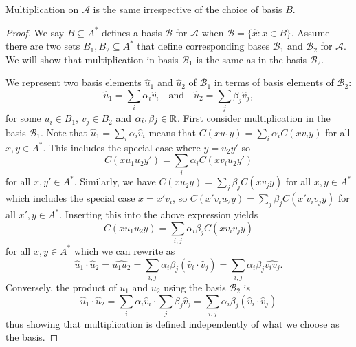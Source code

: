 \documentclass[11pt]{report}
\begin{document}
\begin{prop}
Multiplication on $\mathcal{A}$ is the same irrespective of the choice of basis $B$.
\end{prop}
\begin{proof}

We say $B \subseteq A^*$ defines a basis $\mathcal{B}$ for $\mathcal{A}$ when $\mathcal{B} = \{\hat{x}: x\in B\}$. Assume there are two sets $B_1, B_2 \subseteq A^*$ that define corresponding bases $\mathcal{B}_1$ and $\mathcal{B}_2$ for $\mathcal{A}$. We will show that multiplication in basis $\mathcal{B}_1$ is the same as in the basis $\mathcal{B}_2$.


We represent two basis elements $\hat{u}_1$ and $\hat{u}_2$ of $\mathcal{B}_1$ in terms of basis elements of $\mathcal{B}_2$:
$$\hat{u}_1 = \sum_i \alpha_i \hat{v}_i \quad\text{and}\quad
\hat{u}_2 = \sum_j \beta_j \hat{v}_j,$$
for some $u_i \in B_1$, $v_j \in B_2$ and $\alpha_i, \beta_j  \in \mathbb{R}$.
 First consider multiplication in the basis $\mathcal{B}_1$. Note that $\hat{u}_1 = \sum_i \alpha_i \hat{v}_i$ means that $C(xu_1y) = \sum_i \alpha_i C(xv_iy)$ for all $x,y \in A^*$. This includes the special case where $y = u_2y'$ so $$C(xu_1u_2y') = \sum_i \alpha_i C(xv_iu_2y')$$ for all $x, y' \in A^*$.
Similarly, we have $C(xu_2y) = \sum_j \beta_j C(xv_jy)$ for all $x,y \in A^*$ which includes the special case $x = x'v_i$, so $C(x'v_iu_2y) = \sum_j \beta_j C(x'v_iv_jy)$ for all $x',y \in A^*$. Inserting this into the above expression yields
$$C(xu_1u_2y) = \sum_{i,j} \alpha_i\beta_j C(xv_iv_jy)$$
for all $x,y \in A^*$ which we can rewrite as
$$\hat{u}_1\cdot\hat{u}_2 = \widehat{u_1u_2} = \sum_{i,j}\alpha_i\beta_j (\hat{v}_i\cdot\hat{v}_j)
= \sum_{i,j}\alpha_i\beta_j \widehat{v_iv_j}.$$
Conversely, the product of $u_1$ and $u_2$ using the basis $\mathcal{B}_2$ is
$$\hat{u}_1\cdot \hat{u}_2 = \sum_i \alpha_i \hat{v}_i \cdot \sum_j \beta_j \hat{v}_j =  \sum_{i,j}\alpha_i\beta_j (\hat{v}_i\cdot\hat{v}_j)$$
thus showing that multiplication is defined independently of what we choose as the basis.
\end{proof}
\end{document}
